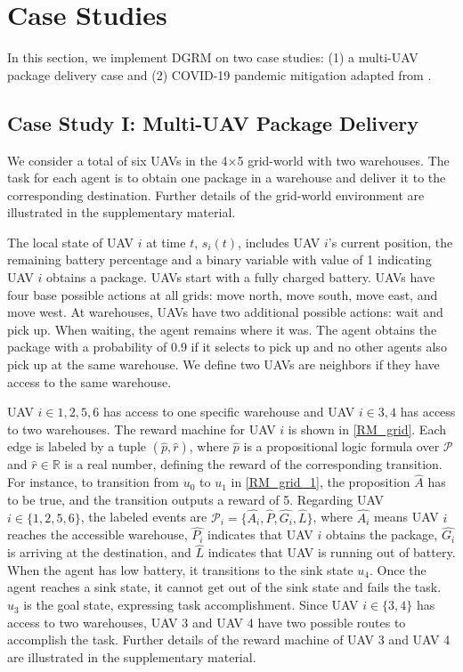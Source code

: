 \documentclass[conf]{new-aiaa}
\def\foo ABC{DGRM}
\begin{document}
\section{Case Studies}

In this section, we implement \foo ABC on two case studies: (1) a multi-UAV package delivery case and (2) COVID-19 pandemic mitigation adapted from \cite{della2020intermittent}.

\subsection{Case Study I: Multi-UAV Package Delivery}

We consider a total of six UAVs in the 4$\times$5 grid-world with two warehouses. The task for each agent is to obtain one package in a warehouse and deliver it to the corresponding destination. Further details of the grid-world environment are illustrated in the supplementary material.

The local state of UAV $i$ at time $t$, $s_i(t)$, includes UAV $i$'s current position, the remaining battery percentage and a binary variable with value of 1 indicating UAV $i$ obtains a package. UAVs start with a fully charged battery. 
UAVs have four base possible actions at all grids: move north, move south, move east, and move west. At warehouses, UAVs have two additional possible actions: wait and pick up. When waiting, the agent remains where it was. The agent obtains the package with a probability of 0.9 if it selects to pick up and no other agents also pick up at the same warehouse. We define two UAVs are neighbors if they have access to the same warehouse.

UAV $i\in{1, 2, 5, 6}$ has access to one specific warehouse and UAV $i\in{3, 4}$ has access to two warehouses. The reward machine for UAV $i$ is shown in \cref{RM_grid}. Each edge is labeled by a tuple $(\hat{p}, \hat{r})$, where $\hat{p}$ is a propositional logic formula over $\mathcal{P}$ and $\hat{r} \in \mathbb{R}$ is a real number, defining the reward of the corresponding transition. For instance, to transition from $u_0$ to $u_1$ in \cref{RM_grid_1}, the proposition $\hat{A}$ has to be true, and the transition outputs a reward of 5. Regarding UAV $i\in \{1,2,5,6 \}$, the labeled events are $\mathcal{P}_i = \{\hat{A_i}, \hat{P}, \hat{G_i}, \hat{L} \}$, where $\hat{A_i}$ means UAV $i$ reaches the accessible warehouse, $\hat{P_i}$ indicates that UAV $i$ obtains the package, $\hat{G_i}$ is arriving at the destination, and $\hat{L}$ indicates that UAV is running out of battery. When the agent has low battery, it transitions to the sink state $u_4$. Once the agent reaches a sink state, it cannot get out of the sink state and fails the task. $u_3$ is the goal state, expressing task accomplishment. Since UAV $i\in \{3, 4\}$ has access to two warehouses, UAV 3 and UAV 4 have two possible routes to accomplish the task. Further details of the reward machine of UAV 3 and UAV 4 are illustrated in the supplementary material. 
\end{document}

